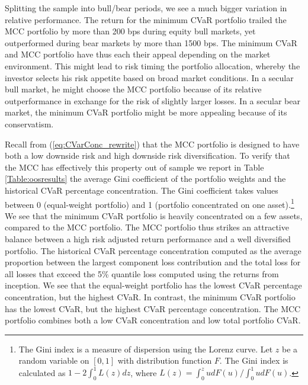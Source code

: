 \documentclass[12pt,a4paper]{article}
\begin{document}
Splitting the sample into bull/bear periods, we see a much bigger variation in relative performance. The return for the minimum CVaR portfolio trailed the MCC portfolio by more than 200 bps during equity bull markets, yet outperformed during bear markets by more than 1500 bps. The minimum CVaR and MCC portfolio have thus each their appeal depending on the market environment. This might lead to risk timing the portfolio allocation, whereby the investor selects his risk appetite based on broad market conditions. In a secular bull market, he might choose the MCC portfolio because of its relative outperformance in exchange for the risk of slightly larger losses. In a secular bear market, the minimum CVaR portfolio might be more appealing because of its conservatism. %

Recall from (\ref{eq:CVarConc_rewrite}) that the MCC portfolio is designed to have both a low downside risk and high downside risk diversification. To verify that the MCC has effectively this property out of sample we report in Table  \ref{Table:oosresults} the average Gini coefficient of the portfolio weights and the historical CVaR percentage concentration. The Gini coefficient takes values between 0 (equal-weight portfolio) and 1 (portfolio concentrated on one asset).\footnote{The Gini index is a measure of dispersion using the Lorenz curve. Let $z$ be a random variable
on $[0,1]$ with distribution function $F$. The Gini index is calculated as $1-2\int_{0}^1 L(z)dz$, where $L(z)=\int_{0}^{z} udF(u)/\int_{0}^1 udF(u)$. } We see that the minimum CVaR portfolio is heavily concentrated on a few assets, compared to the MCC portfolio. The MCC portfolio thus strikes an attractive balance between a high risk adjusted return performance and a well diversified portfolio. The historical CVaR percentage concentration computed as the average proportion between the largest component loss contribution and the total loss for all losses that exceed the 5\% quantile loss computed using the returns from inception. We see that the equal-weight portfolio has the lowest CVaR percentage concentration, but the highest CVaR. In contrast, the minimum CVaR portfolio has the lowest CVaR, but the highest CVaR percentage concentration. The MCC portfolio combines both a low CVaR concentration and low total portfolio CVaR.
\end{document}

